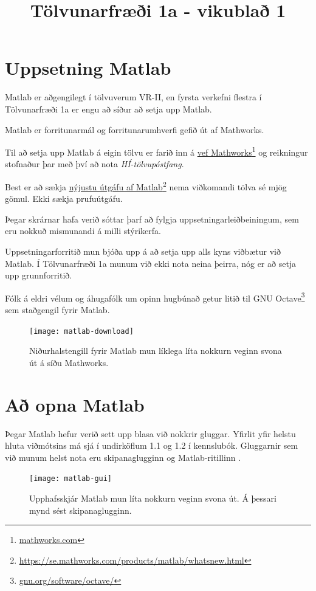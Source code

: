 \documentclass[justified,nobib]{tufte-handout}
\title{Tölvunarfræði 1a - vikublað 1}
\begin{document}
\section{Uppsetning Matlab}
Matlab er aðgengilegt í tölvuverum VR-II, en fyrsta verkefni flestra í Tölvunarfræði 1a er engu að síður að setja upp Matlab.

Matlab er forritunarmál og forritunarumhverfi gefið út af Mathworks. 

Til að setja upp Matlab á eigin tölvu er farið inn á \href{http://www.mathworks.com/}{vef Mathworks}\footnote{\url{mathworks.com}} og reikningur stofnaður þar með því að nota \emph{HÍ-tölvupóstfang}.

Best er að sækja \href{https://se.mathworks.com/products/matlab/whatsnew.html}{nýjustu útgáfu af Matlab}\footnote{\url{https://se.mathworks.com/products/matlab/whatsnew.html}} nema viðkomandi tölva sé mjög gömul. Ekki sækja prufuútgáfu.

Þegar skrárnar hafa verið sóttar þarf að fylgja uppsetningarleiðbeiningum, sem eru nokkuð mismunandi á milli stýrikerfa.

Uppsetningarforritið mun bjóða upp á að setja upp alls kyns viðbætur við Matlab. Í Tölvunarfræði 1a munum við ekki nota neina þeirra, nóg er að setja upp grunnforritið.

Fólk á eldri vélum og áhugafólk um opinn hugbúnað getur litið til GNU Octave\footnote{\url{gnu.org/software/octave/}} sem staðgengil fyrir Matlab.

\begin{figure}
\caption[Niðurhalstengill fyrir Matlab]{Niðurhalstengill fyrir Matlab mun líklega líta nokkurn veginn svona út á síðu Mathworks.}    
\texttt{[image: matlab-download]}
\end{figure}

\section{Að opna Matlab}
Þegar Matlab hefur verið sett upp blasa við nokkrir gluggar. Yfirlit yfir helstu hluta viðmótsins má sjá í undirköflum 1.1 og 1.2 í kennslubók. Gluggarnir sem við munum helst nota eru skipanaglugginn  og Matlab-ritillinn .

\begin{figure}
\caption[Viðmót Matlab]{Upphafsskjár Matlab mun líta nokkurn veginn svona út. Á þessari mynd sést skipanaglugginn.}
\texttt{[image: matlab-gui]}
\end{figure}
\end{document}
